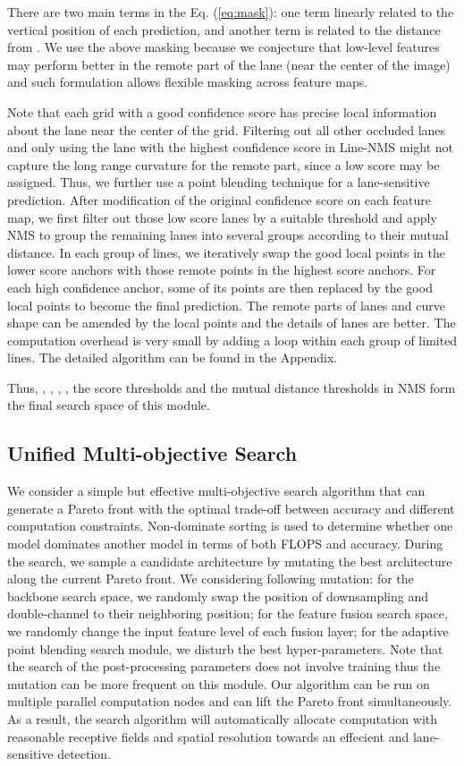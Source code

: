 \documentclass[runningheads]{llncs}
\begin{document}
There are two main terms in the Eq. (\ref{eq:mask}): one term linearly
related to the vertical position of each prediction, and another term
is related to the distance from . We use the above
masking because we conjecture that low-level features may perform
better in the remote part of the lane (near the center of the image)
and such formulation allows flexible masking across feature maps. 

Note that each grid with a good confidence score has precise local
information about the lane near the center of the grid. Filtering
out all other occluded lanes and only using the lane with the highest
confidence score in Line-NMS might not capture the long range curvature
for the remote part, since a low score may be assigned. Thus, we further
use a point blending technique for a lane-sensitive prediction. After
modification of the original confidence score on each feature map,
we first filter out those low score lanes by a suitable threshold
and apply NMS to group the remaining lanes into several groups according
to their mutual distance. In each group of lines, we iteratively swap
the good local points in the lower score anchors with those remote
points in the highest score anchors. For each high confidence anchor,
some of its points are then replaced by the good local points to become
the final prediction. The remote parts of lanes and curve shape can
be amended by the local points and the details of lanes are better.
The computation overhead is very small by adding a loop within each
group of limited lines. The detailed algorithm can be found in the
Appendix.

Thus, , ,  , ,
the score thresholds and the mutual distance thresholds in NMS form
the final search space of this module. 

\subsection{Unified Multi-objective Search}

We consider a simple but effective multi-objective search algorithm
that can generate a Pareto front with the optimal trade-off between
accuracy and different computation constraints. Non-dominate sorting
is used to determine whether one model dominates another model in
terms of both FLOPS and accuracy. During the search, we sample a candidate
architecture by mutating the best architecture along the current Pareto
front. We considering following mutation: for the backbone search
space, we randomly swap the position of downsampling and double-channel
to their neighboring position; for the feature fusion search space,
we randomly change the input feature level of each fusion layer; for
the adaptive point blending search module, we disturb the best hyper-parameters.
Note that the search of the post-processing parameters does not involve
training thus the mutation can be more frequent on this module. Our
algorithm can be run on multiple parallel computation nodes and can
lift the Pareto front simultaneously. As a result, the search algorithm
will automatically allocate computation with reasonable receptive
fields and spatial resolution towards an effecient and lane-sensitive
detection. 
\end{document}
